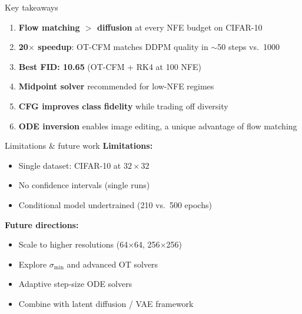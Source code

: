\documentclass[aspectratio=169,10pt]{beamer}
\begin{document}
\begin{frame}{Key takeaways}
\begin{enumerate}
    \item \textbf{Flow matching $>$ diffusion} at every NFE budget on CIFAR-10
    \vspace{0.5em}
    \item \textbf{20$\times$ speedup}: OT-CFM matches DDPM quality in $\sim$50 steps vs.\ 1000
    \vspace{0.5em}
    \item \textbf{Best FID: 10.65} (OT-CFM + RK4 at 100 NFE)
    \vspace{0.5em}
    \item \textbf{Midpoint solver} recommended for low-NFE regimes
    \vspace{0.5em}
    \item \textbf{CFG improves class fidelity} while trading off diversity
    \vspace{0.5em}
    \item \textbf{ODE inversion} enables image editing, a unique advantage of flow matching
\end{enumerate}
\end{frame}

\begin{frame}{Limitations \& future work}
\textbf{Limitations:}
\begin{itemize}
    \item Single dataset: CIFAR-10 at $32 \times 32$
    \item No confidence intervals (single runs)
    \item Conditional model undertrained (210 vs.\ 500 epochs)
\end{itemize}

\vspace{1em}
\textbf{Future directions:}
\begin{itemize}
    \item Scale to higher resolutions (64$\times$64, 256$\times$256)
    \item Explore $\sigma_{\min}$ and advanced OT solvers
    \item Adaptive step-size ODE solvers
    \item Combine with latent diffusion / VAE framework
\end{itemize}
\end{frame}
\end{document}
